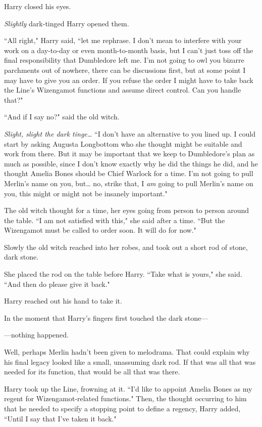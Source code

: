 Harry closed his eyes.

\emph{Slightly} dark-tinged Harry opened them.

``All right," Harry said, ``let me rephrase. I don't mean to interfere with your work on a day-to-day or even month-to-month basis, but I can't just toss off the final responsibility that Dumbledore left me. I'm not going to owl you bizarre parchments out of nowhere, there can be discussions first, but at some point I may have to give you an order. If you refuse the order I might have to take back the Line's Wizengamot functions and assume direct control. Can you handle that?"

``And if I say no?" said the old witch.

\emph{Slight, slight the dark tinge{\ldots}} ``I don't have an alternative to you lined up. I could start by asking Augusta Longbottom who she thought might be suitable and work from there. But it may be important that we keep to Dumbledore's plan as much as possible, since I don't know exactly why he did the things he did, and he thought Amelia Bones should be Chief Warlock for a time. I'm not going to pull Merlin's name on you, but{\ldots} no, strike that, I \emph{am} going to pull Merlin's name on you, this might or might not be insanely important."

The old witch thought for a time, her eyes going from person to person around the table. ``I am not satisfied with this," she said after a time. ``But the Wizengamot must be called to order soon. It will do for now."

Slowly the old witch reached into her robes, and took out a short rod of stone, dark stone.

She placed the rod on the table before Harry. ``Take what is yours," she said. ``And then do please give it back."

Harry reached out his hand to take it.

In the moment that Harry's fingers first touched the dark stone—

—nothing happened.

Well, perhaps Merlin hadn't been given to melodrama. That could explain why his final legacy looked like a small, unassuming dark rod. If that was all that was needed for its function, that would be all that was there.

Harry took up the Line, frowning at it. ``I'd like to appoint Amelia Bones as my regent for Wizengamot-related functions." Then, the thought occurring to him that he needed to specify a stopping point to define a regency, Harry added, ``Until I say that I've taken it back."

